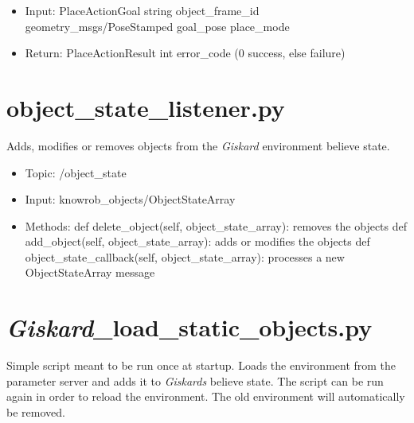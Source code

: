 \documentclass[main.tex]{subfiles}
\begin{document}
			\begin{itemize}
				\item Input: PlaceActionGoal 
				\subitem string object\_frame\_id 
				\subitem geometry\_msgs/PoseStamped goal\_pose
				\subitem place\_mode
				\item Return: PlaceActionResult
				\subitem int error\_code (0 success, else failure)
			\end{itemize}
			
			\section{object\_state\_listener.py} 
			Adds, modifies or removes objects from the \textit{Giskard} environment believe state.
			
			\begin{itemize}
				\item Topic: /object\_state
				\item Input: knowrob\_objects/ObjectStateArray
				\item Methods:
				\subitem def delete\_object(self, object\_state\_array): removes the objects
				\subitem def add\_object(self, object\_state\_array): adds or modifies the objects
				\subitem def object\_state\_callback(self, object\_state\_array): processes a new ObjectStateArray message
			\end{itemize}
			
			\section{\textit{Giskard}\_load\_static\_objects.py} 
			Simple script meant to be run once at startup. Loads the environment from the parameter server and adds it to \textit{Giskards} believe state. 
			The script can be run again in order to reload the environment. The old environment will automatically be removed.
			
			 


			
	\endgroup
\end{document}
